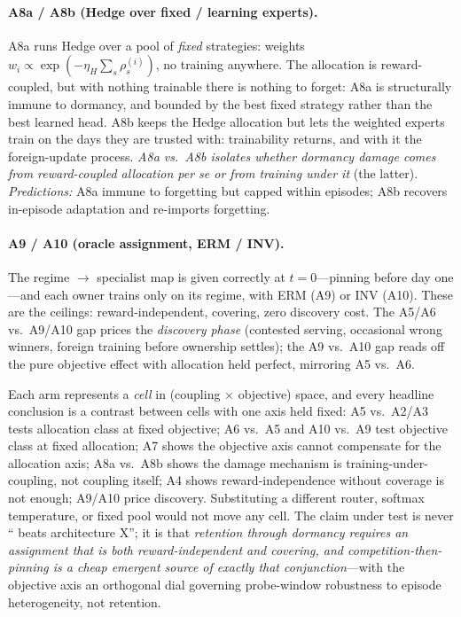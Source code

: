 \paragraph{A8a / A8b (Hedge over fixed / learning experts).} A8a runs Hedge
\citep{freund1997decision} over a pool of \emph{fixed} strategies: weights
$w_i \propto \exp(-\eta_H \sum_s \rho^{(i)}_s)$, no training anywhere. The
allocation is reward-coupled, but with nothing trainable there is nothing to
forget: A8a is structurally immune to dormancy, and bounded by the best
fixed strategy rather than the best learned head. A8b keeps the Hedge
allocation but lets the weighted experts train on the days they are trusted
with: trainability returns, and with it the foreign-update process.
\emph{A8a vs.\ A8b isolates whether dormancy damage comes from
reward-coupled allocation per se or from training under it} (the latter).
\emph{Predictions:} A8a immune to forgetting but capped within episodes;
A8b recovers in-episode adaptation and re-imports forgetting.

\paragraph{A9 / A10 (oracle assignment, ERM / INV).} The regime $\to$
specialist map is given correctly at $t = 0$---pinning before day one---and
each owner trains only on its regime, with ERM (A9) or INV (A10). These are
the ceilings: reward-independent, covering, zero discovery cost. The
A5/A6 vs.\ A9/A10 gap prices the \emph{discovery phase} (contested serving,
occasional wrong winners, foreign training before ownership settles); the
A9 vs.\ A10 gap reads off the pure objective effect with allocation held
perfect, mirroring A5 vs.\ A6.

\begin{keypoint}[title={The arms are an experiment about classes, not architectures}]
Each arm represents a \emph{cell} in (coupling $\times$ objective) space,
and every headline conclusion is a contrast between cells with one axis held
fixed: A5 vs.\ A2/A3 tests allocation class at fixed objective; A6 vs.\ A5
and A10 vs.\ A9 test objective class at fixed allocation; A7 shows the
objective axis cannot compensate for the allocation axis; A8a vs.\ A8b shows
the damage mechanism is training-under-coupling, not coupling itself; A4
shows reward-independence without coverage is not enough; A9/A10 price
discovery. Substituting a different router, softmax temperature, or fixed
pool would not move any cell. The claim under test is never ``\nm{} beats
architecture X''; it is that \emph{retention through dormancy requires an
assignment that is both reward-independent and covering, and
competition-then-pinning is a cheap emergent source of exactly that
conjunction}---with the objective axis an orthogonal dial governing
probe-window robustness to episode heterogeneity, not retention.
\end{keypoint}


